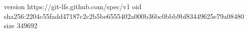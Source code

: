 version https://git-lfs.github.com/spec/v1
oid sha256:2204c55fadd47187c2c2b5be6555402a000b36bc0bbb9bf83449625e79a08480
size 349692
